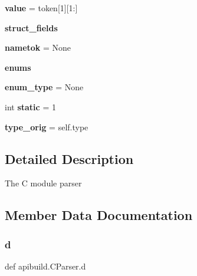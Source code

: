 \begin{DoxyCompactItemize}
\item 
\mbox{\label{classapibuild_1_1_c_parser_a7de5a0fc23bfdf2d068f898aac6b305d}} 
{\bfseries value} = token\mbox{[}1\mbox{]}\mbox{[}1\+:\mbox{]}
\item 
\mbox{\label{classapibuild_1_1_c_parser_a0a8a55a0bae773b4f9627f1016d52fec}} 
{\bfseries struct\+\_\+fields}
\item 
\mbox{\label{classapibuild_1_1_c_parser_a16b638feee09eb3dc400ac077c8cda4b}} 
{\bfseries nametok} = None
\item 
\mbox{\label{classapibuild_1_1_c_parser_ac265789112cf20eafc8d512824248496}} 
{\bfseries enums}
\item 
\mbox{\label{classapibuild_1_1_c_parser_ae1ecec6c2e400bc6326d69f45f8c5245}} 
{\bfseries enum\+\_\+type} = None
\item 
\mbox{\label{classapibuild_1_1_c_parser_a0fcd781ffd8a6cb3c151ce39153ed369}} 
int {\bfseries static} = 1
\item 
\mbox{\label{classapibuild_1_1_c_parser_a4d9f260e678e26e3b1bc71ff5c520838}} 
{\bfseries type\+\_\+orig} = self.\+type
\end{DoxyCompactItemize}


\subsection{Detailed Description}
\begin{DoxyVerb}The C module parser\end{DoxyVerb}
 

\subsection{Member Data Documentation}
\mbox{\label{classapibuild_1_1_c_parser_a80d2a5f34c77fb07df043e7957e52618}} 
\subsubsection{\texorpdfstring{d}{d}}
{\footnotesize\ttfamily def apibuild.\+C\+Parser.\+d\hspace{0.3cm}{\ttfamily [static]}}


